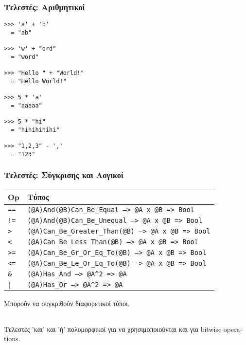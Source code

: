 \documentclass{beamer}
\def\e{\foreignlanguage{english}}
\begin{document}
\begin{frame}[fragile]

\frametitle{Τελεστές: Αριθμητικοί}

\begin{otherlanguage}{english}
\begin{verbatim}
>>> 'a' + 'b'
  = "ab"

>>> 'w' + "ord"
  = "word"

>>> "Hello " + "World!"
  = "Hello World!"

>>> 5 * 'a'
  = "aaaaa"

>>> 5 * "hi"
  = "hihihihihi"

>>> "1,2,3" - ','
  = "123"
\end{verbatim}
\end{otherlanguage}

\end{frame}

\begin{frame}[fragile]

\frametitle{Τελεστές: Σύγκρισης και Λογικοί}

\begin{center}
\begin{tabular}{ |P{0.8cm}|P{9.4cm}| }
 \hline
 \e{Op} & Τύπος
 \\
 \hline
 \e{\texttt{==}} & \e{\texttt{(@A)And(@B)Can\_Be\_Equal --> @A x @B => Bool}}
 \\
 \e{\texttt{!=}} & \e{\texttt{(@A)And(@B)Can\_Be\_Unequal --> @A x @B => Bool}}
 \\
 \e{\texttt{>}} & \e{\texttt{(@A)Can\_Be\_Greater\_Than(@B) --> @A x @B => Bool}}
 \\
 \e{\texttt{<}} & \e{\texttt{(@A)Can\_Be\_Less\_Than(@B) --> @A x @B => Bool}}
 \\
 \e{\texttt{>=}} & \e{\texttt{(@A)Can\_Be\_Gr\_Or\_Eq\_To(@B) --> @A x @B => Bool}}
 \\
 \e{\texttt{<=}} & \e{\texttt{(@A)Can\_Be\_Le\_Or\_Eq\_To(@B) --> @A x @B => Bool}}
 \\
 \e{\texttt{\&}} & \e{\texttt{(@A)Has\_And --> @A}\texttt{\^}\texttt{2 => @A}}
 \\
 \e{\texttt{|}} & \e{\texttt{(@A)Has\_Or --> @A}\texttt{\^}\texttt{2 => @A}}
 \\
 \hline
\end{tabular}
\end{center}

Μπορούν να συγκριθούν διαφορετικοί τύποι.
\\~\

Τελεστές 'και' και 'ή' πολυμορφικοί για να χρησιμοποιούνται και για
\e{bitwise operations}.
\\~\

\end{frame}
\end{document}
